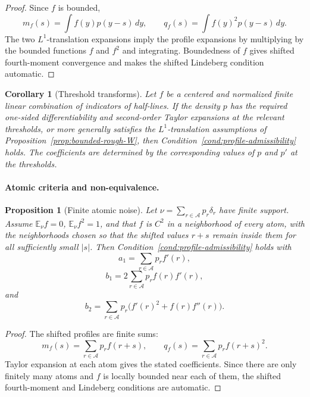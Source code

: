 \documentclass[10pt,a4paper]{amsart}
\newtheorem{proposition}[theorem]{Proposition}
\newtheorem{corollary}[theorem]{Corollary}
\newcommand{\E}{\mathbb E}
\begin{document}
\begin{proof}
Since \(f\) is bounded,
\[
        m_f(s)=\int f(y)p(y-s)\,dy,
        \qquad
        q_f(s)=\int f(y)^2p(y-s)\,dy.
\]
The two \(L^1\)-translation expansions imply the profile expansions by multiplying by the bounded functions \(f\) and \(f^2\) and integrating.  Boundedness of \(f\) gives shifted fourth-moment convergence and makes the shifted Lindeberg condition automatic.
\end{proof}

\begin{corollary}[Threshold transforms]
\label{cor:threshold-W}
Let \(f\) be a centered and normalized finite linear combination of indicators of half-lines.  If the density \(p\) has the required one-sided differentiability and second-order Taylor expansions at the relevant thresholds, or more generally satisfies the \(L^1\)-translation assumptions of Proposition~\ref{prop:bounded-rough-W}, then Condition~\ref{cond:profile-admissibility} holds.  The coefficients are determined by the corresponding values of \(p\) and \(p'\) at the thresholds.
\end{corollary}

\paragraph{Atomic criteria and non-equivalence.}

\begin{proposition}[Finite atomic noise]
\label{prop:atomic-W}
Let \(\nu=\sum_{r\in\mathcal A}p_r\delta_r\) have finite support.  Assume
\(\E_\nu f=0\), \(\E_\nu f^2=1\), and that \(f\) is \(C^2\) in a
neighborhood of every atom, with the neighborhoods chosen so that the shifted
values \(r+s\) remain inside them for all sufficiently small \(|s|\).  Then
Condition~\ref{cond:profile-admissibility} holds with
\[
        a_1=\sum_{r\in\mathcal A}p_rf'(r),
\]
\[
        b_1=2\sum_{r\in\mathcal A}p_rf(r)f'(r),
\]
and
\[
        b_2=\sum_{r\in\mathcal A}p_r\bigl(f'(r)^2+f(r)f''(r)\bigr).
\]
\end{proposition}

\begin{proof}
The shifted profiles are finite sums:
\[
        m_f(s)=\sum_{r\in\mathcal A}p_rf(r+s),
        \qquad
        q_f(s)=\sum_{r\in\mathcal A}p_rf(r+s)^2.
\]
Taylor expansion at each atom gives the stated coefficients.  Since there are only finitely many atoms and \(f\) is locally bounded near each of them, the shifted fourth-moment and Lindeberg conditions are automatic.
\end{proof}
\end{document}
